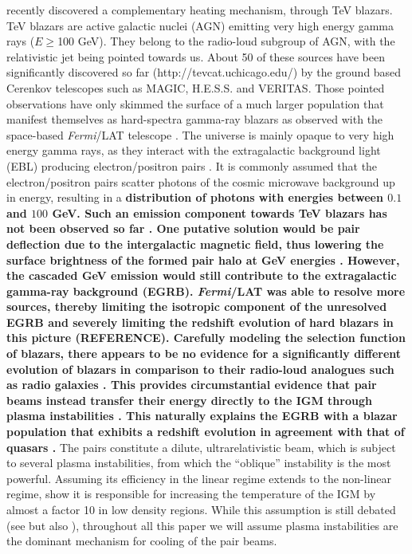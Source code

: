 \documentclass[twocolumns]{emulateapj}
\newcommand\Cc[1]{{\color{blue} \bf #1}} %
\begin{document}
\citet{2012ApJ...752...22B} recently discovered a complementary heating mechanism, through TeV blazars. TeV blazars are active galactic nuclei (AGN) emitting very high energy gamma rays ($E\ge$100 GeV). They belong to the radio-loud subgroup of AGN, with the relativistic jet being pointed towards us. About 50 of these sources have been significantly discovered so far (http://tevcat.uchicago.edu/) by the ground based Cerenkov telescopes such as MAGIC, H.E.S.S. and VERITAS. Those pointed observations have only skimmed the surface of a much larger population that manifest themselves as hard-spectra gamma-ray blazars as observed with the space-based \textit{Fermi}/LAT telescope \citep{2014ApJ...790..137B}. The universe is mainly opaque to very high energy gamma rays, as they interact with the extragalactic background light (EBL) producing electron/positron pairs \citep{1967PhRv..155.1408G,1992ApJ...390L..49S}. It is commonly assumed that the electron/positron pairs scatter photons of the cosmic microwave background up in energy, resulting in a \Cc{distribution of photons with energies between $0.1$ and $100$ GeV. Such an emission component towards TeV blazars has not been observed so far \citep{2010A&A...524A..77A,2014A&A...562A.145H}. One putative solution would be pair deflection due to the intergalactic magnetic field, thus lowering the surface brightness of the formed pair halo at GeV energies \citep{2013A&ARv..21...62D,2012ApJ...747L..14V,2011ApJ...733L..21D}. However, the cascaded GeV emission would still contribute to the extragalactic gamma-ray background (EGRB). \textit{Fermi}/LAT was able to resolve more sources, thereby limiting the isotropic component of the unresolved EGRB and severely limiting the redshift evolution of hard blazars in this picture (REFERENCE). Carefully modeling the selection function of blazars, there appears to be no evidence for a significantly different evolution of blazars in comparison to their radio-loud analogues such as radio galaxies \citep{Giommi:2012,Giommi:2013}. This provides circumstantial evidence that pair beams instead transfer their energy directly to the IGM through plasma instabilities \citep{2012ApJ...752...22B, 2012ApJ...758..102S, 2013ApJ...777...49S, Chang15}. This naturally explains the EGRB with a blazar population that exhibits a redshift evolution in agreement with that of quasars \citep{2014ApJ...790..137B,2013arXiv1308.0015B}.}
The pairs constitute a dilute, ultrarelativistic beam, which is subject to several plasma instabilities, from which the ``oblique'' instability \citep{PhysRevE.70.046401} is the most powerful. Assuming its efficiency in the linear regime extends to the non-linear regime, \citet{2012ApJ...752...23C} show it is responsible for increasing the temperature of the IGM by almost a factor 10 in low density regions. While this assumption is still debated (see \citet{2013ApJ...770...54M,2014ApJ...787...49S} but also \citet{2013ApJ...777...49S,2012ApJ...758..102S,Chang15}), throughout all this paper we will assume plasma instabilities are the dominant mechanism for cooling of the pair beams.
\end{document}
